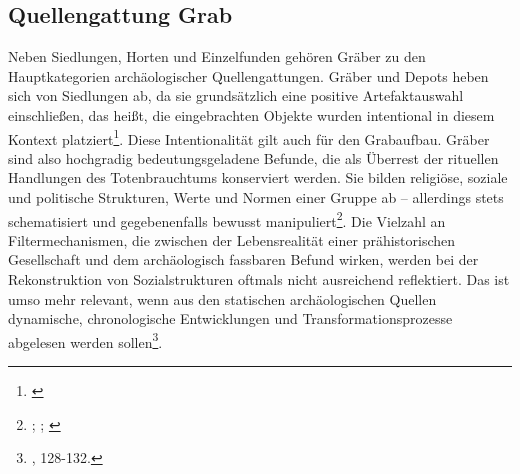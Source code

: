 \documentclass[openany,twoside,twocolumn]{book}
\let\rmarkdownfootnote\footnote%
\def\footnote{\protect\rmarkdownfootnote}
\begin{document}
\hypertarget{quellengattung-grab}{%
\subsection{Quellengattung Grab}\label{quellengattung-grab}}

Neben Siedlungen, Horten und Einzelfunden gehören Gräber zu den
Hauptkategorien archäologischer Quellengattungen. Gräber und Depots
heben sich von Siedlungen ab, da sie grundsätzlich eine positive
Artefaktauswahl einschließen, das heißt, die eingebrachten Objekte
wurden intentional in diesem Kontext platziert\footnote{\textcite{eggers_einfuhrung_1959}}.
Diese Intentionalität gilt auch für den Grabaufbau. Gräber sind also
hochgradig bedeutungsgeladene Befunde, die als Überrest der rituellen
Handlungen des Totenbrauchtums konserviert werden. Sie bilden religiöse,
soziale und politische Strukturen, Werte und Normen einer Gruppe ab --
allerdings stets schematisiert und gegebenenfalls bewusst
manipuliert\footnote{\textcite{harke_final_1997};
  \textcite{humphreys_comparative_1981}; \textcite{palgi_death_1984}}.
Die Vielzahl an Filtermechanismen, die zwischen der Lebensrealität einer
prähistorischen Gesellschaft und dem archäologisch fassbaren Befund
wirken, werden bei der Rekonstruktion von Sozialstrukturen oftmals nicht
ausreichend reflektiert. Das ist umso mehr relevant, wenn aus den
statischen archäologischen Quellen dynamische, chronologische
Entwicklungen und Transformationsprozesse abgelesen werden
sollen\footnote{\textcite{hofmann_rituelle_2008}, 128-132.}.
\end{document}
